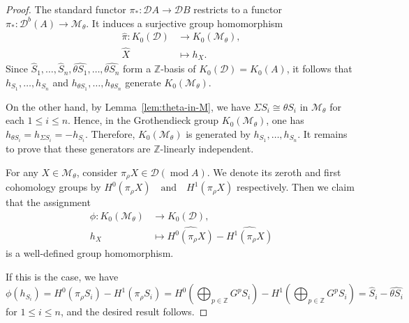 \documentclass[12pt,reqno]{amsart}
\numberwithin{equation}{section}
\renewcommand{\mod}{\operatorname{mod}\nolimits}
\newcommand{\go}{{K_0}}
\begin{document}
	\begin{proof}
		The standard functor
		$\pi_*:\mathcal{D}A\rightarrow \mathcal{D}B$
		restricts to a functor
		$\pi_*:\mathcal{D}^b(A)\rightarrow \mathcal{M}_\theta .$
		It induces a surjective group homomorphism
		\begin{align*}
			\hat{\pi}:\go(\mathcal{D})&\longrightarrow \go(\mathcal{M}_\theta),\\
			\hat X&\longmapsto h_{X}.
		\end{align*}
		Since
		$\hat{S}_1,\ldots,\hat{S}_n,
		\hat{\theta S_1},\ldots,\hat{\theta S_n}$
		form a $\mathbb{Z}$-basis of
		$\go(\mathcal{D})=\go(A)$, it follows that
		$h_{S_1},\ldots,h_{S_n}$ and $
		h_{\theta S_1},\ldots,h_{\theta S_n}$
		generate $\go(\mathcal{M}_\theta)$.
		
		On the other hand, by Lemma~\ref{lem:theta-in-M}, we have
		$\Sigma S_i\cong \theta S_i$
		in $\mathcal{M}_\theta$ for each $1\leq i\leq n$. Hence, in the
		Grothendieck group $\go(\mathcal{M}_\theta)$, one has $h_{\theta S_i}=h_{\Sigma S_i}=-h_{S_i}.$
		Therefore, $\go(\mathcal{M}_\theta)$ is generated by
		$h_{S_1},\ldots,h_{S_n}.$
		It remains to prove that these generators are $\mathbb{Z}$-linearly independent.
		
		For any $X\in \mathcal{M}_\theta$, consider
		$\pi_\rho X\in \mathcal{D}(\mod A).$ We denote its zeroth and first cohomology groups by
		$H^0(\pi_\rho X)\quad \text{and}\quad H^1(\pi_\rho X)$ respectively. Then we claim that the assignment
		\begin{align*}
			\phi:\go(\mathcal{M}_\theta)&\longrightarrow \go(\mathcal{D}),\\
			h_X&\longmapsto \widehat{H^0(\pi_\rho X)}-\widehat{H^1(\pi_\rho X)}
		\end{align*}
		is a well-defined group homomorphism.
		
		If this is the case, we have
		\[
		\phi(h_{S_i})=H^0(\pi_\rho S_i)-H^1(\pi_\rho S_i)=H^0(\bigoplus_{p\in \mathbb{Z}} G^p S_i)-H^1(\bigoplus_{p\in \mathbb{Z}} G^p S_i)=
		\hat{S}_i-\hat{\theta S_i}
		\]
		for $1\leq i\leq n$, and the desired result follows.
		

\end{proof}
\end{document}
